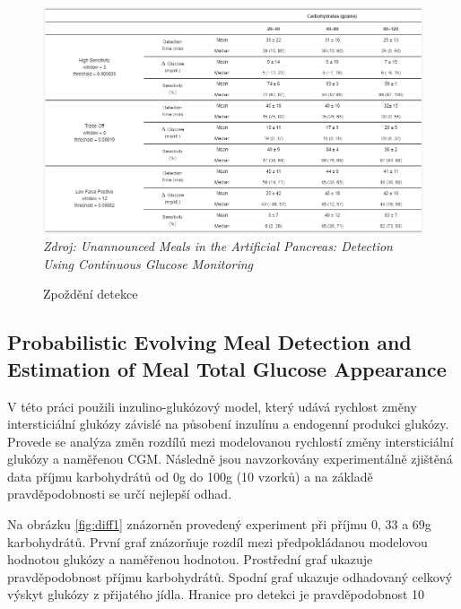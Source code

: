 \begin{figure}[H]
\caption{Zpoždění detekce}
\label{fig:crosscovariance3}
\includegraphics[width=1\textwidth]{img/analyza/crosscovariance3.png}\\
\textit{Zdroj: Unannounced Meals in the Artificial Pancreas: Detection Using Continuous Glucose Monitoring \citep{Analyza.CrossCovariance}}
\end{figure}


\subsection{Probabilistic Evolving Meal Detection and Estimation of Meal Total Glucose Appearance}
\label{ch:diff}

V této práci \citet{Analyza.Diff} použili inzulino-glukózový model, který udává rychlost změny intersticiální glukózy závislé na působení inzulínu a endogenní produkci glukózy. Provede se analýza změn rozdílů mezi modelovanou rychlostí změny intersticiální glukózy a naměřenou CGM. Následně jsou navzorkovány experimentálně zjištěná data příjmu karbohydrátů od 0g do 100g (10 vzorků) a na základě pravděpodobnosti se určí nejlepší odhad.

Na obrázku \ref{fig:diff1} znázorněn provedený experiment při příjmu 0, 33 a 69g karbohydrátů. První graf znázorňuje rozdíl mezi předpokládanou modelovou hodnotou glukózy a naměřenou hodnotou. Prostřední graf ukazuje pravděpodobnost příjmu karbohydrátů. Spodní graf ukazuje odhadovaný celkový výskyt glukózy z přijatého jídla. Hranice pro detekci je pravděpodobnost 10%

